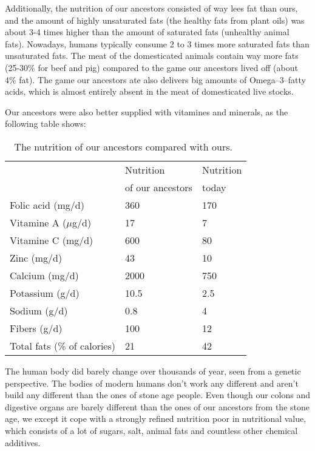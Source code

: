 \documentclass[../main.tex]{subfiles}
\begin{document}
Additionally, the nutrition of our ancestors consisted of way lees fat than ours, and the amount of
highly unsaturated fats (the healthy fats from plant oils) was about 3-4 times higher
than the amount of saturated fats
(unhealthy animal fats).
Nowadays, humans typically consume 2 to 3 times more saturated fats than unsaturated fats.
The meat of the domesticated animals contain way more fats (25-30\% for beef and pig)
compared to the game our ancestors lived off (about 4\% fat).
The game our ancestors ate also delivers big amounts of Omega--3--fatty acids,
which is almost entirely absent in the meat of domesticated live stocks.

Our ancestors  were also better supplied with vitamines and minerals, as the following table shows:

\begin{table}[htb]
  \centering
  \begin{tabular}{l|l|l}
    & Nutrition & Nutrition \\
    & of our ancestors & today \\
    \hline
    Folic acid (mg/d) & 360 & 170 \\
    Vitamine A  ($\mu$g/d) & 17 & 7 \\
    Vitamine C (mg/d) & 600 & 80\\
    Zinc (mg/d) & 43 & 10 \\
    Calcium (mg/d) & 2000 & 750 \\
    Potassium (g/d) & 10.5 & 2.5 \\
    Sodium (g/d) & 0.8 & 4 \\
    Fibers (g/d) & 100 & 12 \\
    Total fats (\% of calories) & 21 & 42 \\
    \hline
  \end{tabular}
  \caption[Nutrition of our ancestors.]{The nutrition of our ancestors compared with ours.~\cite{EatonAl}}
\end{table}

The human body did barely change over thousands of year, seen from a genetic perspective.
The bodies of modern humans don't work any different and aren't build any different than the ones of stone age people.
Even though our colons and digestive organs are barely different than the ones of our ancestors from the stone age,
we except it cope with a strongly refined nutrition poor in nutritional value, which consists of a lot of sugars, salt,
animal fats and countless other chemical additives.
\end{document}

